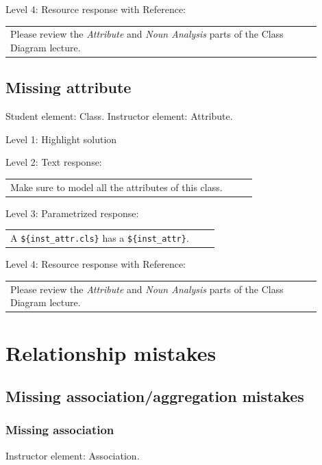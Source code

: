 \noindent Level 4: Resource response with Reference: \medskip

\begin{tabular}{|p{0.9\linewidth}}
Please review the \textit{Attribute} and \textit{Noun Analysis} parts of the Class Diagram lecture.
\end{tabular} \medskip


\subsection{Missing attribute}

Student element: Class. Instructor element: Attribute. \medskip

\noindent Level 1: Highlight solution  \medskip

\noindent Level 2: Text response: \medskip

\begin{tabular}{|p{0.9\linewidth}}
Make sure to model all the attributes of this class.
\end{tabular} \medskip

\noindent Level 3: Parametrized response: \medskip

\begin{tabular}{|p{0.9\linewidth}}
A \verb|${inst_attr.cls}| has a \verb|${inst_attr}|.
\end{tabular} \medskip

\noindent Level 4: Resource response with Reference: \medskip

\begin{tabular}{|p{0.9\linewidth}}
Please review the \textit{Attribute} and \textit{Noun Analysis} parts of the Class Diagram lecture.
\end{tabular} \medskip



\section{Relationship mistakes}

\subsection{Missing association/aggregation mistakes}

\subsubsection{Missing association}

Instructor element: Association. \medskip

